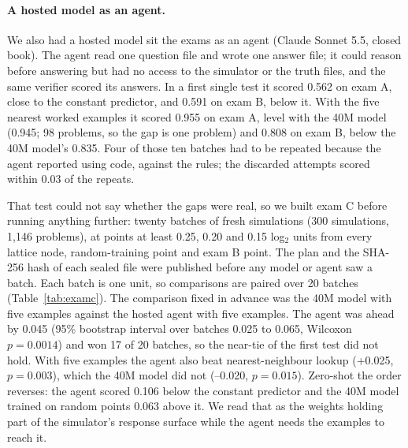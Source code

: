\documentclass[11pt]{article}
\begin{document}
\paragraph{A hosted model as an agent.} We also had a hosted model sit
the exams as an agent (Claude Sonnet 5.5, closed book). The agent read one
question file and wrote one answer file; it could reason before answering
but had no access to the simulator or the truth files, and the same verifier
scored its answers. In a first single test it scored 0.562 on exam A, close
to the constant predictor, and 0.591 on exam B, below it. With the five
nearest worked examples it scored 0.955 on exam A, level with the 40M model
(0.945; 98 problems, so the gap is one problem) and 0.808 on exam B, below
the 40M model's 0.835. Four of those ten batches had to be repeated because
the agent reported using code, against the rules; the discarded attempts
scored within 0.03 of the repeats.

That test could not say whether the gaps were real, so we built exam C
before running anything further: twenty batches of fresh simulations
(300 simulations, 1,146 problems), at points at least 0.25, 0.20 and 0.15
log$_2$ units from every lattice node, random-training point and exam B point.
The plan and the SHA-256 hash of each sealed file were published before any
model or agent saw a batch. Each batch is one unit, so comparisons are paired
over 20 batches (Table~\ref{tab:examc}). The comparison fixed in advance was
the 40M model with five examples against the hosted agent with five examples.
The agent was ahead by 0.045 (95\% bootstrap interval over batches 0.025 to
0.065, Wilcoxon $p=0.0014$) and won 17 of 20 batches, so the near-tie of the
first test did not hold. With five examples the agent also beat nearest-neighbour
lookup (+0.025, $p=0.003$), which the 40M model did not (--0.020, $p=0.015$).
Zero-shot the order reverses: the agent scored 0.106 below the constant predictor
and the 40M model trained on random points 0.063 above it. We read that as the
weights holding part of the simulator's response surface while the agent needs
the examples to reach it.
\end{document}
